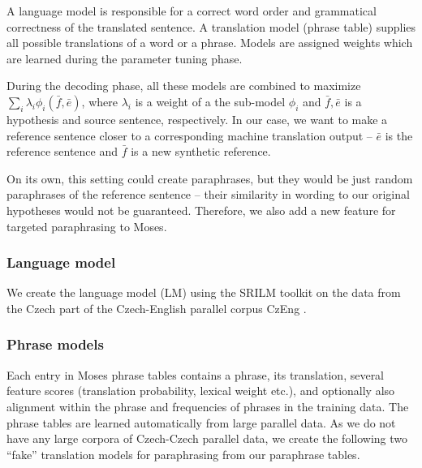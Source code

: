 \documentclass[11pt]{article}
\begin{document}
A language model is responsible for a correct word order and grammatical correctness 
of the translated sentence. A translation model (phrase table) supplies all possible 
translations of a word or a phrase. Models are assigned weights which are learned 
during the parameter tuning phase.

During the decoding phase, all these models are combined to maximize 
$ \sum_i \lambda_i \phi_i (\bar{f},\bar{e}) $, where  $ \lambda_i $ is a weight 
of a the sub-model $ \phi_i $ and $ \bar{f},\bar{e} $ is a hypothesis and source 
sentence, respectively. In our case, we want to make a reference sentence closer
to a corresponding machine translation output -- $ \bar{e} $ is the reference 
sentence and $ \bar{f} $ is a new synthetic reference.

On its own, this setting could create paraphrases, but they would be just random
paraphrases of the reference sentence -- their similarity in wording to our original 
hypotheses would not be guaranteed. Therefore, we also add a new feature for targeted 
paraphrasing to Moses.

\subsubsection{Language model}
We create the language model (LM) using the SRILM toolkit \cite{srilm} on the 
data from the Czech part of the Czech-English parallel corpus CzEng \cite{czeng}. 

\subsubsection{Phrase models}
Each entry in Moses phrase tables contains a phrase, its translation, several
feature scores (translation probability, lexical weight etc.), and optionally
also alignment within the phrase and frequencies of phrases in the training data.
The phrase tables are learned automatically from large parallel data.
As we do not have any large corpora of Czech-Czech parallel data, we create the 
following two ``fake'' translation models for paraphrasing from our paraphrase 
tables. 
\end{document}
